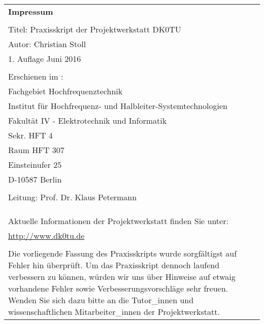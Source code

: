 \thispagestyle{empty}

\begin{tabular}{p{13cm} p{1cm}}
\textbf{Impressum} &\\
&\\
Titel: Praxisskript der Projektwerkstatt DK0TU&\\
Autor: Christian Stoll&\\
1. Auflage Juni 2016 &\\
&\\
Erschienen im :&\\
Fachgebiet Hochfrequenztechnik &\\
Institut für Hochfrequenz- und Halbleiter-Systemtechnologien&\\
Fakultät IV - Elektrotechnik und Informatik &\\
Sekr. HFT 4 &\\
Raum HFT 307 &\\
Einsteinufer 25 &\\
D-10587 Berlin &\\
&\\
Leitung: Prof. Dr. Klaus Petermann &\\
&\\
&\\
&\\
Aktuelle Informationen der Projektwerkstatt finden Sie unter:  &\\
\url{http://www.dk0tu.de} &\\
&\\
Die vorliegende Fassung des Praxisskripts wurde sorgfältigst auf Fehler hin überprüft. Um das Praxisskript dennoch laufend verbessern zu können, würden wir uns über Hinweise auf etwaig vorhandene Fehler sowie Verbesserungsvorschläge sehr freuen. Wenden Sie sich dazu bitte an die Tutor\_innen und wissenschaftlichen Mitarbeiter\_innen der Projektwerkstatt. &\\
\end{tabular}



